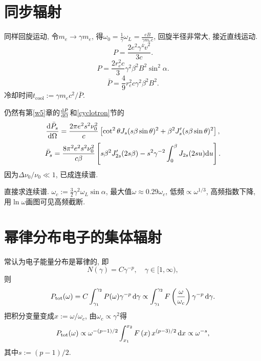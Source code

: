 \section{同步辐射}

同样回旋运动, 令$m_e\to\gamma m_e$, 得$\omega_0=\frac{1}{\gamma}\omega_L=\frac{eB}{\gamma m_ec}$, 回旋半径非常大, 接近直线运动.
\begin{equation}
    P=\frac{2e^2\gamma^4\dot{v}^2}{3c}.
\end{equation}
\begin{equation}
    P=\frac{2r_e^2c}{3}\gamma^2\beta^2B^2\sin^2\alpha.
\end{equation}
\begin{equation}
    \bar{P}=\frac{4}{9}r_e^2c\gamma^2\beta^2B^2.
\end{equation}
冷却时间$t_\text{cool}:=\gamma m_ec^2/\bar{P}$.

仍然有第\ref{w5}章的$\frac{\mathrm{d} P}{\mathrm{d}\Omega}$和\ref{cyclotron}节的
\begin{equation}
    \frac{\mathrm{d}\bar{P}_s}{\mathrm{d}\Omega}
    =\frac{2\pi e^2s^2\nu_0^2}{c}
    \left[\cot^2\theta J_s(s\beta\sin\theta)^2+\beta^2J_s'(s\beta\sin\theta)^2\right],
\end{equation}
\begin{equation}
    \bar{P}_s
    =\frac{8\pi^2e^2s^2\nu_0^2}{c\beta}
    \left[s\beta^2J_{2s}'(2s\beta)-s^2\gamma^{-2}\int_0^\beta J_{2s}(2su)\mathrm{d} u\right].
\end{equation}
因为$\Delta\nu_0/\nu_0\ll1$, 已成连续谱.

直接求连续谱. $\omega_c:=\frac{3}{2}\gamma^2\omega_L\sin\alpha$, 最大值$\omega\approx0.29\omega_c$, 低频$\propto\omega^{1/3}$, 高频指数下降, 用$\ln\omega$画图可见高频截断.

\section{幂律分布电子的集体辐射}

常认为电子能量分布是幂律的, 即
\begin{equation}
    N(\gamma)=C\gamma^{-p},\quad\gamma\in[1,\infty),
\end{equation}
则
\begin{equation}
    P_\text{tot}(\omega)=C\int_{\gamma_1}^{\gamma_2}P(\omega)\gamma^{-p}\,\mathrm{d}\gamma\propto\int_{\gamma_1}^{\gamma_2}F\left(\frac{\omega}{\omega_c}\right)\gamma^{-p}\,\mathrm{d}\gamma.
\end{equation}
把积分变量变成$x:=\omega/\omega_c$, 由$\omega_c\propto\gamma^2$得
\begin{equation}
    P_\text{tot}(\omega)\propto\omega^{-(p-1)/2}\int_{x_1}^{x_2}F\left(x\right)x^{(p-3)/2}\,\mathrm{d} x\propto\omega^{-s},
\end{equation}
其中$s:=(p-1)/2$.

